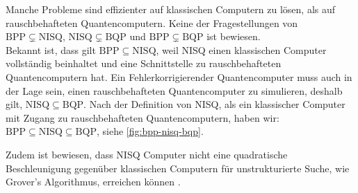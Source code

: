 Manche Probleme sind effizienter auf klassischen Computern zu lösen, als auf rauschbehafteten Quantencomputern.
Keine der Fragestellungen von $\mathrm{BPP} \subsetneq \mathrm{NISQ}$, $\mathrm{NISQ} \subsetneq \mathrm{BQP}$ und $\mathrm{BPP} \subsetneq \mathrm{BQP}$ ist bewiesen.\\
Bekannt ist, dass gilt $\mathrm{BPP} \subseteq \mathrm{NISQ}$, weil NISQ einen klassischen Computer vollständig beinhaltet und eine Schnittstelle zu rauschbehafteten Quantencomputern hat.
Ein Fehlerkorrigierender Quantencomputer muss auch in der Lage sein, einen rauschbehafteten Quantencomputer zu simulieren, deshalb gilt, $\mathrm{NISQ} \subseteq \mathrm{BQP}$.
Nach der Definition von NISQ, als ein klassischer Computer mit Zugang zu rauschbehafteten Quantencomputern, haben wir: $\mathrm{BPP} \subseteq \mathrm{NISQ} \subseteq \mathrm{BQP}$, siehe \ref{fig:bpp-nisq-bqp}.

Zudem ist bewiesen, dass NISQ Computer nicht eine quadratische Beschleunigung gegenüber klassischen Computern für unstrukturierte Suche, wie Grover's Algorithmus, erreichen können \cite{chenComplexityNISQ2023}.